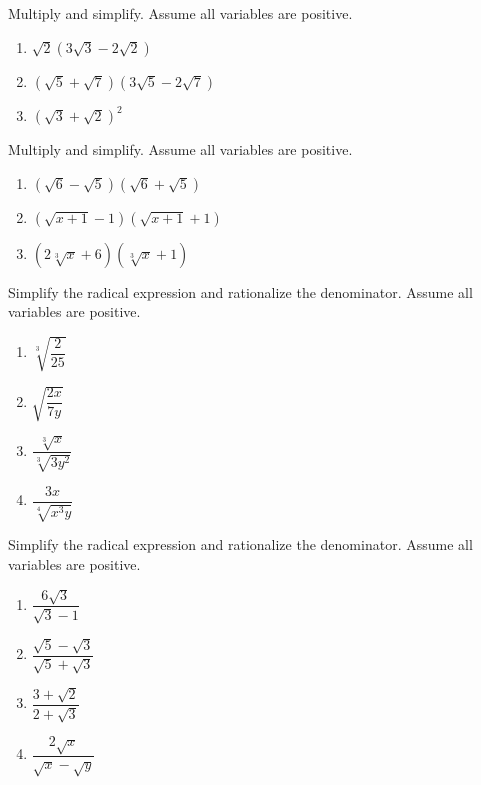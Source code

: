 \documentclass[en,12pt]{elegantbook}
\providecommand{\tightlist}{%
  \setlength{\itemsep}{0pt}\setlength{\parskip}{0pt}}
\let\BeginKnitrBlock\begin \let\EndKnitrBlock\end
\begin{document}
\BeginKnitrBlock{exercise}
\protect\hypertarget{exr:unnamed-chunk-113}{}{\label{exr:unnamed-chunk-113} }
Multiply and simplify. Assume all variables are positive.

\begin{enumerate}
\def\labelenumi{\arabic{enumi}.}
\tightlist
\item
  \(\sqrt2(3\sqrt3-2\sqrt2)\)
\item
  \((\sqrt5+\sqrt7)(3\sqrt5-2\sqrt7)\)
\item
  \((\sqrt3+\sqrt2)^2\)
\end{enumerate}
\EndKnitrBlock{exercise}

\BeginKnitrBlock{exercise}
\protect\hypertarget{exr:unnamed-chunk-114}{}{\label{exr:unnamed-chunk-114} }
Multiply and simplify. Assume all variables are positive.

\begin{enumerate}
\def\labelenumi{\arabic{enumi}.}
\tightlist
\item
  \((\sqrt6-\sqrt5)(\sqrt6+\sqrt5)\)
\item
  \((\sqrt{x+1}-1)(\sqrt{x+1}+1)\)
\item
  \((2\sqrt[3]x+6)(\sqrt[3]x+1)\)
\end{enumerate}
\EndKnitrBlock{exercise}

\BeginKnitrBlock{exercise}
\protect\hypertarget{exr:unnamed-chunk-115}{}{\label{exr:unnamed-chunk-115} }
Simplify the radical expression and rationalize the denominator. Assume all variables are positive.

\begin{enumerate}
\def\labelenumi{\arabic{enumi}.}
\tightlist
\item
  \(\sqrt[3]{\dfrac2{25}}\)
\item
  \(\sqrt{\dfrac{2x}{7y}}\)
\item
  \(\dfrac{\sqrt[3]{x}}{\sqrt[3]{3y^2}}\)
\item
  \(\dfrac{3x}{\sqrt[4]{x^3y}}\)
\end{enumerate}
\EndKnitrBlock{exercise}

\BeginKnitrBlock{exercise}
\protect\hypertarget{exr:unnamed-chunk-116}{}{\label{exr:unnamed-chunk-116} }
Simplify the radical expression and rationalize the denominator. Assume all variables are positive.

\begin{enumerate}
\def\labelenumi{\arabic{enumi}.}
\tightlist
\item
  \(\dfrac{6\sqrt3}{\sqrt3-1}\)
\item
  \(\dfrac{\sqrt5-\sqrt3}{\sqrt5+\sqrt3}\)
\item
  \(\dfrac{3+\sqrt2}{2+\sqrt3}\)
\item
  \(\dfrac{2\sqrt{x}}{\sqrt x- \sqrt y}\)
\end{enumerate}
\EndKnitrBlock{exercise}
\end{document}
